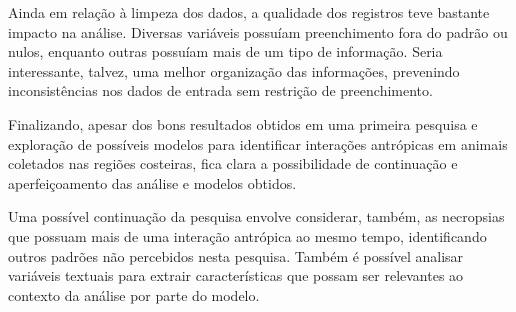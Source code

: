 \documentclass[12pt]{article}
\begin{document}
Ainda em relação à limpeza dos dados, a qualidade dos registros teve bastante impacto na análise. Diversas variáveis possuíam preenchimento fora do padrão ou nulos, enquanto outras possuíam mais de um tipo de informação. Seria interessante, talvez, uma melhor organização das informações, prevenindo inconsistências nos dados de entrada sem restrição de preenchimento.

Finalizando, apesar dos bons resultados obtidos em uma primeira pesquisa e exploração de possíveis modelos para identificar interações antrópicas em animais coletados nas regiões costeiras, fica clara a possibilidade de continuação e aperfeiçoamento das análise e modelos obtidos.

Uma possível continuação da pesquisa envolve considerar, também, as necropsias que possuam mais de uma interação antrópica ao mesmo tempo, identificando outros padrões não percebidos nesta pesquisa. Também é possível analisar variáveis textuais para extrair características que possam ser relevantes ao contexto da análise por parte do modelo.



\end{document}
